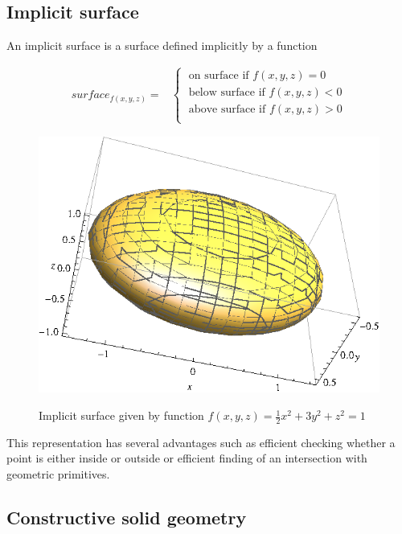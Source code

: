 \subsection{Implicit surface}
An implicit surface\cite{Agin1972} is a surface defined implicitly by a function

\begin{equation}
\begin{split}
surface_{f(x,y,z)} =
  &\left\{\;
    \begin{split}
      \text{on surface if }f(x,y,z) = 0 \\ 
      \text{below surface if }f(x,y,z) < 0 \\
      \text{above surface if }f(x,y,z) > 0 \\
    \end{split}
  \right.
\end{split}
\end{equation}

\begin{figure}[H]
\centering
\includegraphics[scale=1]{../img/implicit_surface.eps}
\label{fig:implicit}
\caption{Implicit surface given by function $f(x,y,z) = \frac{1}{2}x^{2} + 3y^{2} + z^{2} = 1$}
\end{figure}
This representation has several advantages such as efficient checking whether a point is either
inside or outside or efficient finding of an intersection with geometric primitives.


\subsection{Constructive solid geometry}

